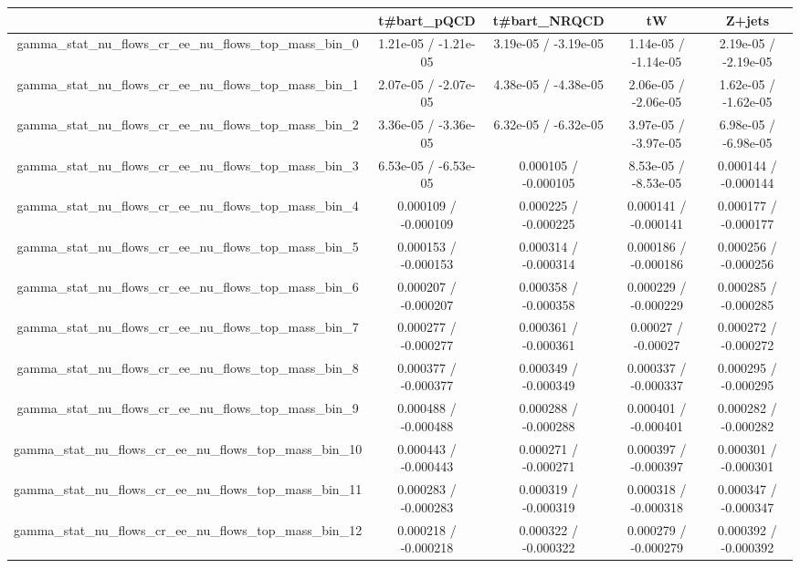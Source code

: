 \documentclass[10pt]{article}
\begin{document}
\begin{table}[htbp]
\begin{center}
\begin{tabular}{|c|c|c|c|c|}
\hline 
      & t#bar{t}_{pQCD}      & t#bar{t}_{NRQCD}      & tW      & Z+jets \\ 
\hline 
  gamma_stat_nu_flows_cr_ee_nu_flows_top_mass_bin_0 & 1.21e-05 / -1.21e-05 & 3.19e-05 / -3.19e-05 & 1.14e-05 / -1.14e-05 & 2.19e-05 / -2.19e-05 \\ 
  gamma_stat_nu_flows_cr_ee_nu_flows_top_mass_bin_1 & 2.07e-05 / -2.07e-05 & 4.38e-05 / -4.38e-05 & 2.06e-05 / -2.06e-05 & 1.62e-05 / -1.62e-05 \\ 
  gamma_stat_nu_flows_cr_ee_nu_flows_top_mass_bin_2 & 3.36e-05 / -3.36e-05 & 6.32e-05 / -6.32e-05 & 3.97e-05 / -3.97e-05 & 6.98e-05 / -6.98e-05 \\ 
  gamma_stat_nu_flows_cr_ee_nu_flows_top_mass_bin_3 & 6.53e-05 / -6.53e-05 & 0.000105 / -0.000105 & 8.53e-05 / -8.53e-05 & 0.000144 / -0.000144 \\ 
  gamma_stat_nu_flows_cr_ee_nu_flows_top_mass_bin_4 & 0.000109 / -0.000109 & 0.000225 / -0.000225 & 0.000141 / -0.000141 & 0.000177 / -0.000177 \\ 
  gamma_stat_nu_flows_cr_ee_nu_flows_top_mass_bin_5 & 0.000153 / -0.000153 & 0.000314 / -0.000314 & 0.000186 / -0.000186 & 0.000256 / -0.000256 \\ 
  gamma_stat_nu_flows_cr_ee_nu_flows_top_mass_bin_6 & 0.000207 / -0.000207 & 0.000358 / -0.000358 & 0.000229 / -0.000229 & 0.000285 / -0.000285 \\ 
  gamma_stat_nu_flows_cr_ee_nu_flows_top_mass_bin_7 & 0.000277 / -0.000277 & 0.000361 / -0.000361 & 0.00027 / -0.00027 & 0.000272 / -0.000272 \\ 
  gamma_stat_nu_flows_cr_ee_nu_flows_top_mass_bin_8 & 0.000377 / -0.000377 & 0.000349 / -0.000349 & 0.000337 / -0.000337 & 0.000295 / -0.000295 \\ 
  gamma_stat_nu_flows_cr_ee_nu_flows_top_mass_bin_9 & 0.000488 / -0.000488 & 0.000288 / -0.000288 & 0.000401 / -0.000401 & 0.000282 / -0.000282 \\ 
  gamma_stat_nu_flows_cr_ee_nu_flows_top_mass_bin_10 & 0.000443 / -0.000443 & 0.000271 / -0.000271 & 0.000397 / -0.000397 & 0.000301 / -0.000301 \\ 
  gamma_stat_nu_flows_cr_ee_nu_flows_top_mass_bin_11 & 0.000283 / -0.000283 & 0.000319 / -0.000319 & 0.000318 / -0.000318 & 0.000347 / -0.000347 \\ 
  gamma_stat_nu_flows_cr_ee_nu_flows_top_mass_bin_12 & 0.000218 / -0.000218 & 0.000322 / -0.000322 & 0.000279 / -0.000279 & 0.000392 / -0.000392 \\ 

\end{tabular}
\end{center}
\end{table}
\end{document}
